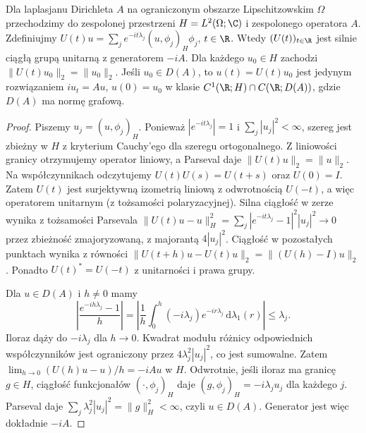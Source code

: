 \begin{twierdzenie}
\label{thm:pde12-unitary}
Dla laplasjanu Dirichleta $A$ na ograniczonym obszarze
Lipschitzowskim $\Omega$ przechodzimy do zespolonej przestrzeni
$H=L^2(\Omega;\C)$ i zespolonego operatora $A$.
Zdefiniujmy $U(t)u=\sum_je^{-it\lambda_j}(u,\phi_j)_H\phi_j$,
$t\in\R$. Wtedy $(U(t))_{t\in\R}$ jest silnie
ciągłą grupą unitarną z generatorem $-iA$.
Dla każdego $u_0\in H$ zachodzi $\|U(t)u_0\|_2=\|u_0\|_2$.
Jeśli $u_0\in D(A)$, to $u(t)=U(t)u_0$ jest jedynym
rozwiązaniem $iu_t=Au$, $u(0)=u_0$ w klasie
$C^1(\R;H)\cap C(\R;D(A))$, gdzie $D(A)$ ma normę grafową.
\end{twierdzenie}
\begin{proof}
Piszemy $u_j=(u,\phi_j)_H$. Ponieważ $|e^{-it\lambda_j}|=1$
i $\sum_j|u_j|^2<\infty$, szereg jest zbieżny w $H$
z kryterium Cauchy'ego dla szeregu ortogonalnego.
Z liniowości granicy otrzymujemy operator liniowy,
a Parseval daje $\|U(t)u\|_2=\|u\|_2$.
Na współczynnikach odczytujemy
$U(t)U(s)=U(t+s)$ oraz $U(0)=I$.
Zatem $U(t)$ jest surjektywną izometrią liniową
z odwrotnością $U(-t)$, a więc operatorem unitarnym
(z tożsamości polaryzacyjnej).
Silna ciągłość w zerze wynika z tożsamości Parsevala
$\|U(t)u-u\|_H^2=\sum_j|e^{-it\lambda_j}-1|^2|u_j|^2\to0$
przez zbieżność zmajoryzowaną, z majorantą
$4|u_j|^2$. Ciągłość w pozostałych punktach wynika z równości
$\|U(t+h)u-U(t)u\|_2=\|(U(h)-I)u\|_2$.
Ponadto $U(t)^*=U(-t)$ z unitarności i prawa grupy.

Dla $u\in D(A)$ i $h\ne0$ mamy
\[
 \left|\frac{e^{-ih\lambda_j}-1}{h}\right|
 =\left|\frac{1}{h}\int_0^h(-i\lambda_j)e^{-ir\lambda_j}
 \,\mathrm d\lambda_1(r)\right|\le\lambda_j .
\]
Iloraz dąży do $-i\lambda_j$ dla $h\to0$.
Kwadrat modułu różnicy odpowiednich współczynników
jest ograniczony przez $4\lambda_j^2|u_j|^2$,
co jest sumowalne. Zatem
$\lim_{h\to0}(U(h)u-u)/h=-iAu$ w $H$.
Odwrotnie, jeśli iloraz ma granicę $g\in H$,
ciągłość funkcjonałów $(\cdot,\phi_j)_H$ daje
$(g,\phi_j)_H=-i\lambda_j u_j$ dla każdego $j$.
Parseval daje $\sum_j\lambda_j^2|u_j|^2=\|g\|_H^2<\infty$,
czyli $u\in D(A)$.
Generator jest więc dokładnie $-iA$.


\end{proof}
